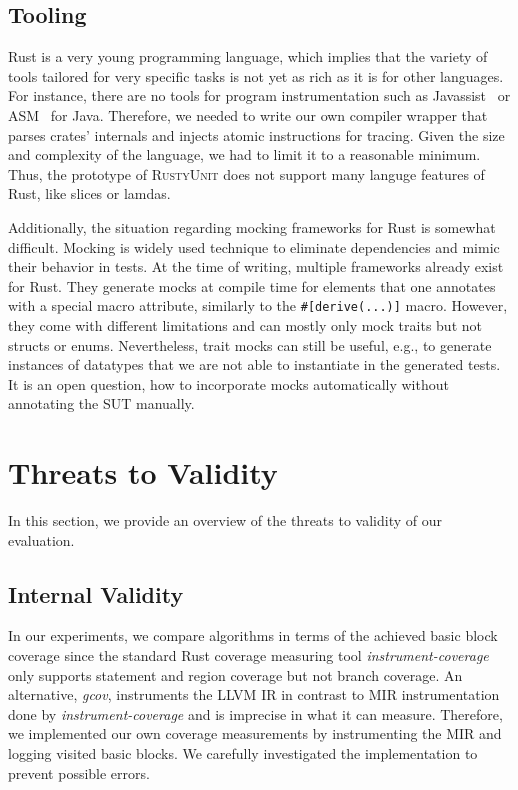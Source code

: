 \documentclass[paper=a4,%
  twoside,%
  BCOR4mm,%
  abstract=true,%
  toc=bibliography,%
  chapterprefix=true,%
  toc=bibliographynumbered,%
  open=right,%
  english,%
  pagesize=pdftex]{scrreprt}
\newcommand{\tech}{\textsc{RustyUnit}\xspace}
\newcommand{\mir}{\ac{MIR}\xspace}
\newcommand{\sut}{\ac{SUT}\xspace}
\begin{document}
\subsection*{Tooling}
Rust is a very young programming language, which implies that the variety of tools tailored for very specific tasks is not yet as rich as it is for other languages. For instance, there are no tools for program instrumentation such as Javassist~\cite{Chiba2000} or ASM~\cite{Bruneton2002} for Java. Therefore, we needed to write our own compiler wrapper that parses crates' internals and injects atomic instructions for tracing. Given the size and complexity of the language, we had to limit it to a reasonable minimum. Thus, the prototype of \tech does not support many languge features of Rust, like slices or lamdas.

Additionally, the situation regarding mocking frameworks for Rust is somewhat difficult. Mocking is widely used technique to eliminate dependencies and mimic their behavior in tests. At the time of writing, multiple frameworks already exist for Rust. They generate mocks at compile time for elements that one annotates with a special macro attribute, similarly to the \texttt{\#[derive(...)]} macro. However, they come with different limitations and can mostly only mock traits but not structs or enums. Nevertheless, trait mocks can still be useful, e.g., to generate instances of datatypes that we are not able to instantiate in the generated tests. It is an open question, how to incorporate mocks automatically without annotating the \sut manually.

\section{Threats to Validity}
\label{sec:threats-to-validity}
In this section, we provide an overview of the threats to validity of our evaluation.

\subsection*{Internal Validity}
In our experiments, we compare algorithms in terms of the achieved basic block coverage since the standard Rust coverage measuring tool \emph{instrument-coverage} only supports statement and region coverage but not branch coverage. An alternative, \emph{gcov}, instruments the LLVM \ac{IR} in contrast to \mir instrumentation done by \emph{instrument-coverage} and is imprecise in what it can measure. Therefore, we implemented our own coverage measurements by instrumenting the \mir and logging visited basic blocks. We carefully investigated the implementation to prevent possible errors.
\end{document}
